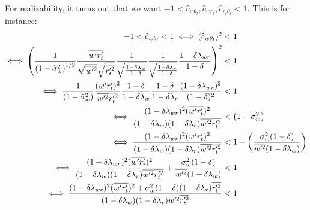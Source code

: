 For realizability, it turns out that we want $-1 < \widehat{c}_{w \theta_l}, \widehat{c}_{w r_t}, \widehat{c}_{r_t \theta_l} < 1$.
This is for instance:
\begin{align*}
    -1 < \widehat{c}_{w \theta_l} < 1
    \iff
    (\widehat{c}_{w \theta_l})^2 &< 1 \\
    \iff
    \left(\frac{1}{\left( 1 - \tilde{\sigma}_w^2 \right)^{1/2}} \frac{\overline{w' r_t'}}{\sqrt{\overline{w'^2}}\sqrt{\overline{r_t'^2}}} \frac{1}{\sqrt{\frac{1 - \delta \lambda_w}{1 - \delta}}} \frac{1}{\sqrt{\frac{1 - \delta \lambda_r}{1-\delta}}} \frac{1 - \delta \lambda_{w r}}{1-\delta}\right)^2 &< 1 \\
    \iff
    \frac{1}{\left( 1 - \tilde{\sigma}_w^2 \right)} \frac{(\overline{w' r_t'})^2}{\overline{w'^2}\overline{r_t'^2}} \frac{1 - \delta}{1 - \delta \lambda_w} \frac{1 - \delta}{1 - \delta \lambda_r} \frac{(1 - \delta \lambda_{w r})^2}{(1 - \delta)^2} &< 1 \\
    \iff
    \frac{(1 - \delta \lambda_{w r})^2 (\overline{w' r_t'})^2}{(1 - \delta \lambda_w)(1 - \delta \lambda_r) \overline{w'^2}\overline{r_t'^2}} &< \left( 1 - \tilde{\sigma}_w^2 \right) \\
    \iff
    \frac{(1 - \delta \lambda_{w r})^2 (\overline{w' r_t'})^2}{(1 - \delta \lambda_w)(1 - \delta \lambda_r) \overline{w'^2}\overline{r_t'^2}} &< 1 - \left(\frac{\sigma_w^2(1-\delta)}{\overline{w'^2}(1-\delta\lambda_w)}\right) \\
    \iff
    \frac{(1 - \delta \lambda_{w r})^2 (\overline{w' r_t'})^2}{(1 - \delta \lambda_w)(1 - \delta \lambda_r) \overline{w'^2}\overline{r_t'^2}} + \frac{\sigma_w^2(1-\delta)}{\overline{w'^2}(1-\delta\lambda_w)} &< 1 \\
    \iff
    \frac{(1 - \delta \lambda_{w r})^2 (\overline{w' r_t'})^2 + \sigma_w^2(1-\delta)(1 - \delta \lambda_r)\overline{r_t'^2}}{(1 - \delta \lambda_w)(1 - \delta \lambda_r) \overline{w'^2}\overline{r_t'^2}} &< 1 \\
\end{align*}